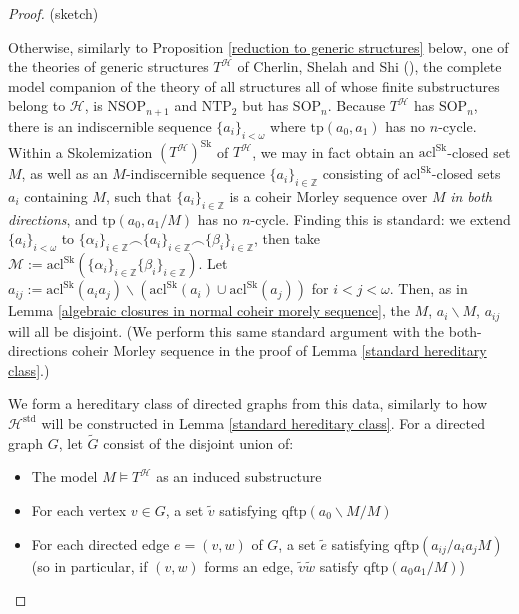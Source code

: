 \documentclass{amsart}
\theoremstyle{definition}
\theoremstyle{remark}
\numberwithin{equation}{section}
\begin{document}
\begin{proof} (sketch)


    Otherwise, similarly to Proposition \ref{reduction to generic structures} below, one of the theories of generic structures $T^{\mathcal{H}}$ of Cherlin, Shelah and Shi (\cite{CSS99}), the complete model companion of the theory of all structures all of whose finite substructures belong to $\mathcal{H}$, is $\mathrm{NSOP}_{n+1}$ and $\mathrm{NTP}_{2}$ but has $\mathrm{SOP}_{n}$. Because $T^{\mathcal{H}}$ has $\mathrm{SOP}_{n}$, there is an indiscernible sequence $\{a_{i}\}_{i < \omega}$ where $\mathrm{tp}(a_{0}, a_{1})$ has no $n$-cycle. Within a Skolemization $(T^{\mathcal{H}})^{\mathrm{Sk}}$ of $T^{\mathcal{H}}$, we may in fact obtain an $\mathrm{acl}^{\mathrm{Sk}}$-closed set $M$, as well as an $M$-indiscernible sequence $\{a_{i}\}_{i \in \mathbb{Z}}$ consisting of $\mathrm{acl}^{\mathrm{Sk}}$-closed sets $a_{i}$ containing $M$, such that $\{a_{i}\}_{i \in \mathbb{Z}}$ is a coheir Morley sequence over $M$ \textit{in both directions}, and $\mathrm{tp}(a_{0}, a_{1}/M)$ has no $n$-cycle. Finding this is standard: we extend $\{a_{i}\}_{i < \omega }$ to $\{\alpha_{i}\}_{i \in \mathbb{Z}} \smallfrown \{a_{i}\}_{i \in \mathbb{Z}} \smallfrown \{\beta_{i}\}_{i \in \mathbb{Z}}$, then take $\mathcal{M} := \mathrm{acl}^{\mathrm{Sk}}(\{\alpha_i\}_{i \in \mathbb{Z}}\{\beta_i\}_{i \in \mathbb{Z}})$. Let $a_{ij} := \mathrm{acl}^{\mathrm{Sk}}(a_{i}a_{j})\backslash (\mathrm{acl}^{\mathrm{Sk}}(a_{i}) \cup \mathrm{acl^{\mathrm{Sk}}}(a_{j}))$ for $i < j < \omega$. Then, as in Lemma \ref{algebraic closures in normal coheir morely sequence}, the $M$, $a_{i}\backslash M$, $a_{ij}$ will all be disjoint. (We perform this same standard argument with the both-directions coheir Morley sequence in the proof of Lemma \ref{standard hereditary class}.)

    We form a hereditary class of directed graphs from this data, similarly to how $\mathcal{H}^{\mathrm{std}}$ will be constructed in Lemma \ref{standard hereditary class}. For a directed graph $G$, let $\tilde{G}$ consist of the disjoint union of:

\begin{itemize}
    \item The model $M \models T^{\mathcal{H}}$ as an induced substructure

    \item For each vertex $v \in G$, a set $\tilde{v}$ satisfying $\mathrm{qftp}(a_{0}\backslash M / M)$

    \item For each directed edge $e=(v, w)$ of $G$, a set $\tilde{e}$ satisfying $\mathrm{qftp}(a_{ij} /a_{i}a_{j}M)$ (so in particular, if $(v, w)$ forms an edge, $\tilde{v}\tilde{w}$ satisfy $\mathrm{qftp}(a_{0}a_{1}/M)$)
\end{itemize}


\end{proof}
\end{document}

